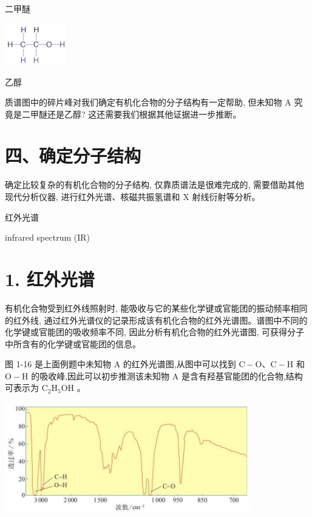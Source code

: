 \documentclass[10pt]{article}
\begin{document}
二甲醚

\begin{center}
\includegraphics[max width=0.2\textwidth]{images/0190efc5-b58a-7c43-bfb0-e0a030df9cfd_23_218732.jpg}
\end{center}

乙醇

质谱图中的碎片峰对我们确定有机化合物的分子结构有一定帮助, 但未知物 \(\mathrm{A}\) 究竟是二甲醚还是乙醇? 这还需要我们根据其他证据进一步推断。

\section*{四、确定分子结构}

确定比较复杂的有机化合物的分子结构, 仅靠质谱法是很难完成的, 需要借助其他现代分析仪器, 进行红外光谱、核磁共振氢谱和 \(\mathrm{X}\) 射线衍射等分析。

\begin{mdframed}

红外光谱

infrared spectrum (IR)

\end{mdframed}

\section*{1. 红外光谱}

有机化合物受到红外线照射时, 能吸收与它的某些化学键或官能团的振动频率相同的红外线, 通过红外光谱仪的记录形成该有机化合物的红外光谱图。谱图中不同的化学键或官能团的吸收频率不同, 因此分析有机化合物的红外光谱图, 可获得分子中所含有的化学键或官能团的信息。

图 1-16 是上面例题中未知物 \(\mathrm{A}\) 的红外光谱图,从图中可以找到 \(\mathrm{C} - \mathrm{O}\text{、}\mathrm{C} - \mathrm{H}\) 和 \(\mathrm{O} - \mathrm{H}\) 的吸收峰,因此可以初步推测该未知物 \(\mathrm{A}\) 是含有羟基官能团的化合物,结构可表示为 \({\mathrm{C}}_{2}{\mathrm{H}}_{5}\mathrm{{OH}}\) 。

\begin{center}
\includegraphics[max width=0.8\textwidth]{images/0190efc5-b58a-7c43-bfb0-e0a030df9cfd_24_997363.jpg}
\end{center}
\end{document}
